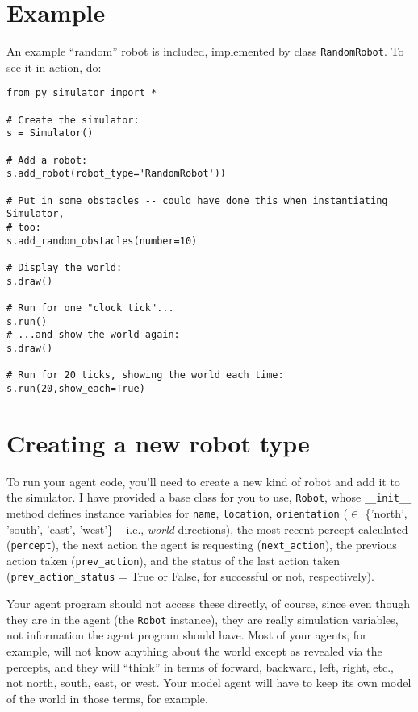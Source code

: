 \documentclass[11pt]{tufte-handout}
\begin{document}
\section{Example}
\label{sec:orgb531bb1}
An example ``random'' robot is included, implemented by class \texttt{RandomRobot}.  To see it in action, do:
\begin{verbatim}
from py_simulator import *

# Create the simulator:
s = Simulator()

# Add a robot:
s.add_robot(robot_type='RandomRobot'))

# Put in some obstacles -- could have done this when instantiating Simulator,
# too:
s.add_random_obstacles(number=10)

# Display the world:
s.draw()

# Run for one "clock tick"...
s.run()
# ...and show the world again:
s.draw()

# Run for 20 ticks, showing the world each time:
s.run(20,show_each=True)
\end{verbatim}

\section{Creating a new robot type}
\label{sec:orgc89bbe3}

To run your agent code, you'll need to create a new kind of robot and add it to the simulator.  I have provided a base class for you to use, \texttt{Robot}, whose \texttt{\_\_init\_\_} method defines instance variables for \texttt{name}, \texttt{location}, \texttt{orientation} (\(\in\) \{'north', 'south', 'east', 'west'\} -- i.e., \emph{world} directions), the most recent percept calculated (\texttt{percept}), the next action the agent is requesting (\texttt{next\_action}), the previous action taken (\texttt{prev\_action}), and the status of the last action taken (\texttt{prev\_action\_status} = True or False, for successful or not, respectively).

Your agent program should not access these directly, of course, since even though they are in the agent (the \texttt{Robot} instance), they are really simulation variables, not information the agent program should have.  Most of your agents, for example, will not know anything about the world except as revealed via the percepts, and they will ``think'' in terms of forward, backward, left, right, etc., not north, south, east, or west.  Your model agent will have to keep its own model of the world in those terms, for example.  
\end{document}
